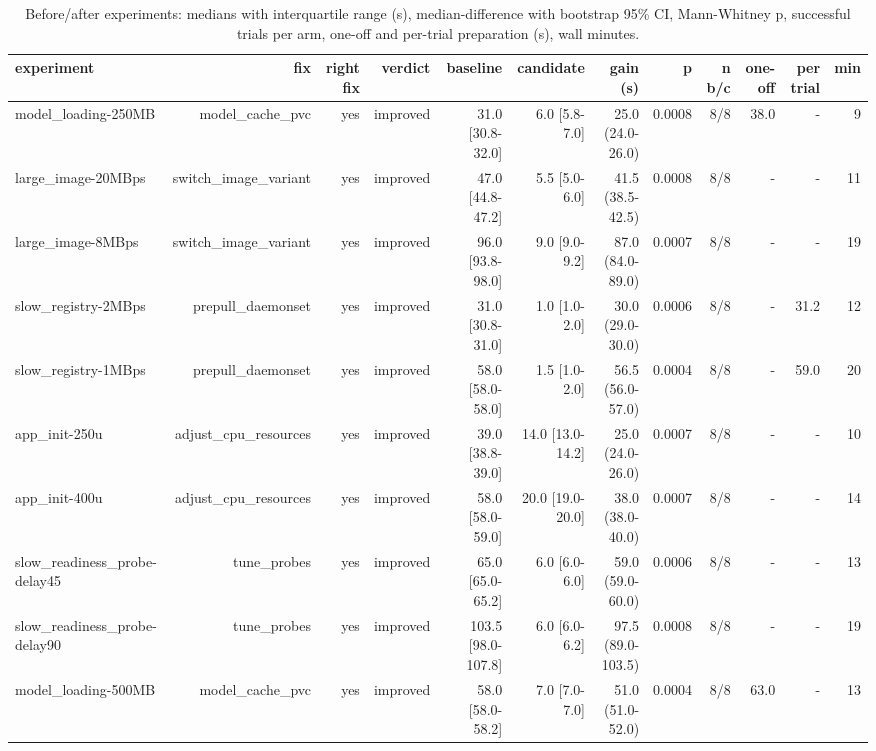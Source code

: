 \begin{table}[t]
\centering\small
\caption{Before/after experiments: medians with interquartile range (s), median-difference with bootstrap 95\% CI, Mann-Whitney p, successful trials per arm, one-off and per-trial preparation (s), wall minutes.}\label{tab:rq3_main}
\begin{tabular}{lrrrrrrrrrrr}
\toprule
experiment & fix & right fix & verdict & baseline & candidate & gain (s) & p & n b/c & one-off & per trial & min \\
\midrule
model\_loading-250MB & model\_cache\_pvc & yes & improved & 31.0 [30.8-32.0] & 6.0 [5.8-7.0] & 25.0 (24.0-26.0) & 0.0008 & 8/8 & 38.0 & - & 9 \\
large\_image-20MBps & switch\_image\_variant & yes & improved & 47.0 [44.8-47.2] & 5.5 [5.0-6.0] & 41.5 (38.5-42.5) & 0.0008 & 8/8 & - & - & 11 \\
large\_image-8MBps & switch\_image\_variant & yes & improved & 96.0 [93.8-98.0] & 9.0 [9.0-9.2] & 87.0 (84.0-89.0) & 0.0007 & 8/8 & - & - & 19 \\
slow\_registry-2MBps & prepull\_daemonset & yes & improved & 31.0 [30.8-31.0] & 1.0 [1.0-2.0] & 30.0 (29.0-30.0) & 0.0006 & 8/8 & - & 31.2 & 12 \\
slow\_registry-1MBps & prepull\_daemonset & yes & improved & 58.0 [58.0-58.0] & 1.5 [1.0-2.0] & 56.5 (56.0-57.0) & 0.0004 & 8/8 & - & 59.0 & 20 \\
app\_init-250u & adjust\_cpu\_resources & yes & improved & 39.0 [38.8-39.0] & 14.0 [13.0-14.2] & 25.0 (24.0-26.0) & 0.0007 & 8/8 & - & - & 10 \\
app\_init-400u & adjust\_cpu\_resources & yes & improved & 58.0 [58.0-59.0] & 20.0 [19.0-20.0] & 38.0 (38.0-40.0) & 0.0007 & 8/8 & - & - & 14 \\
slow\_readiness\_probe-delay45 & tune\_probes & yes & improved & 65.0 [65.0-65.2] & 6.0 [6.0-6.0] & 59.0 (59.0-60.0) & 0.0006 & 8/8 & - & - & 13 \\
slow\_readiness\_probe-delay90 & tune\_probes & yes & improved & 103.5 [98.0-107.8] & 6.0 [6.0-6.2] & 97.5 (89.0-103.5) & 0.0008 & 8/8 & - & - & 19 \\
model\_loading-500MB & model\_cache\_pvc & yes & improved & 58.0 [58.0-58.2] & 7.0 [7.0-7.0] & 51.0 (51.0-52.0) & 0.0004 & 8/8 & 63.0 & - & 13 \\
\bottomrule
\end{tabular}
\end{table}
